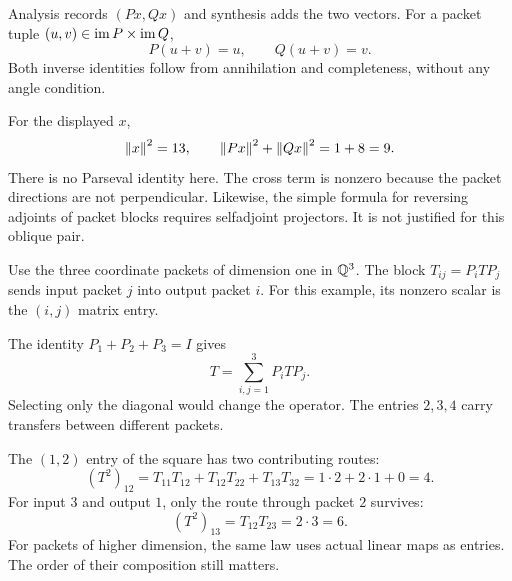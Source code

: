 
Analysis records $(Px,Qx)$ and synthesis adds the two vectors. For a packet tuple $(u,v)\in\operatorname{im} P\times\operatorname{im} Q$,
\[
P(u+v)=u,\qquad Q(u+v)=v.
\]
Both inverse identities follow from annihilation and completeness, without any angle condition.

For the displayed $x$,
\[
\left\lVert x\right\rVert^2=13,\qquad \left\lVert Px\right\rVert^2+\left\lVert Qx\right\rVert^2=1+8=9.
\]
There is no Parseval identity here. The cross term is nonzero because the packet directions are not perpendicular. Likewise, the simple formula for reversing adjoints of packet blocks requires selfadjoint projectors. It is not justified for this oblique pair.


Use the three coordinate packets of dimension one in $\mathbb Q^3$. The block $T_{ij}=P_iTP_j$ sends input packet $j$ into output packet $i$. For this example, its nonzero scalar is the $(i,j)$ matrix entry.


The identity $P_1+P_2+P_3=I$ gives
\[
T=\sum_{i,j=1}^3 P_iTP_j.
\]
Selecting only the diagonal would change the operator. The entries $2,3,4$ carry transfers between different packets.

The $(1,2)$ entry of the square has two contributing routes:
\[
(T^2)_{12}=T_{11}T_{12}+T_{12}T_{22}+T_{13}T_{32}
=1\cdot2+2\cdot1+0=4.
\]
For input $3$ and output $1$, only the route through packet $2$ survives:
\[
(T^2)_{13}=T_{12}T_{23}=2\cdot3=6.
\]
For packets of higher dimension, the same law uses actual linear maps as entries. The order of their composition still matters.


